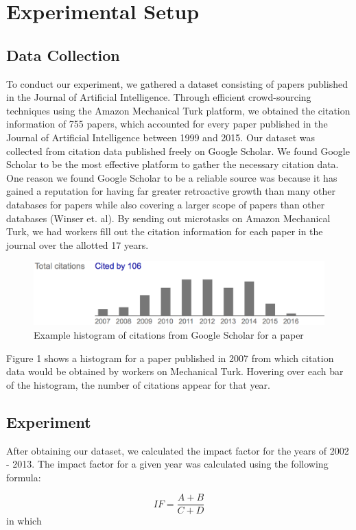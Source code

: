 \documentclass[times]{jtitauth}
\begin{document}
\section{Experimental Setup}
\subsection {Data Collection}
To conduct our experiment, we gathered a dataset consisting of papers published in the Journal of Artificial Intelligence. Through efficient crowd-sourcing techniques using the Amazon Mechanical Turk platform, we obtained the citation information of 755 papers, which accounted for every paper published in the Journal of Artificial Intelligence between 1999 and 2015. Our dataset was collected from citation data published freely on Google Scholar. We found Google Scholar to be the most effective platform to gather the necessary citation data. One reason we found Google Scholar to be a reliable source was because it has gained a reputation for having far greater retroactive growth than many other databases for papers while also covering a larger scope of papers than other databases (Winser et. al). By sending out microtasks on Amazon Mechanical Turk, we had workers fill out the citation information for each paper in the journal over the allotted 17 years. 
\begin{figure}[!hbp]
\includegraphics[scale=0.25]{fig}
\caption{Example histogram of citations from Google Scholar for a paper}
\end{figure}

Figure 1 shows a histogram for a paper published in 2007 from which citation data would be obtained by workers on Mechanical Turk. Hovering over each bar of the histogram, the number of citations appear for that year. 
\subsection{Experiment}
After obtaining our dataset, we calculated the impact factor for the years of 2002 - 2013. The impact factor for a given year was calculated using the following formula: 

\begin{equation}
IF =  \frac{A + B}{C+D} 
\end{equation}
\noindent in which\\
\end{document}
